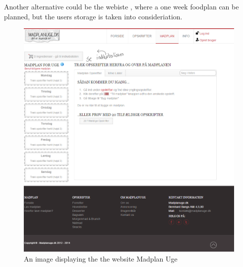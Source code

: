 
Another alternative could be the webiste %
, where a one week foodplan can be planned, but the users storage is taken into consideriation.

\begin{figure}[H]
    \centering
    \includegraphics[width=\textwidth]{Grafik/madplanuge}
    \caption{An image displaying the the website Madplan Uge}
    \label{MadPlanUge}
\end{figure}


